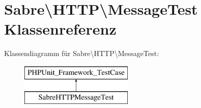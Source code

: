 \hypertarget{class_sabre_1_1_h_t_t_p_1_1_message_test}{}\section{Sabre\textbackslash{}H\+T\+TP\textbackslash{}Message\+Test Klassenreferenz}
\label{class_sabre_1_1_h_t_t_p_1_1_message_test}
Klassendiagramm für Sabre\textbackslash{}H\+T\+TP\textbackslash{}Message\+Test\+:\begin{figure}[H]
\begin{center}
\leavevmode
\includegraphics[height=2.000000cm]{class_sabre_1_1_h_t_t_p_1_1_message_test}
\end{center}
\end{figure}
